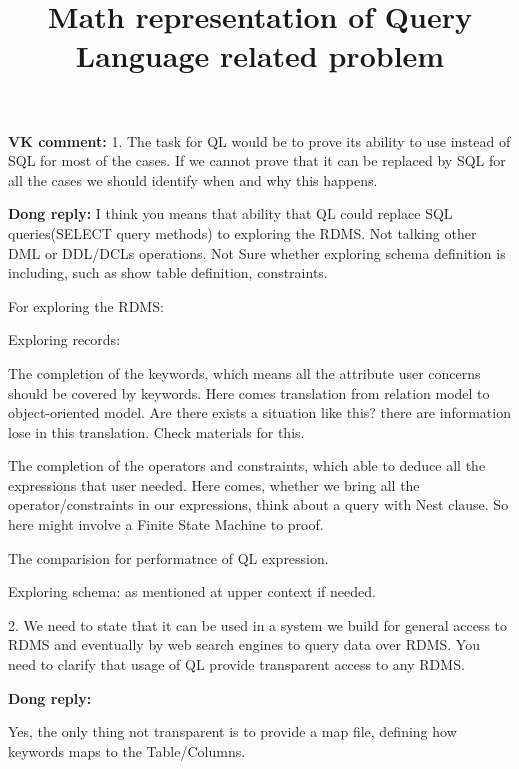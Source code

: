 \textheight 215mm
\textwidth 145mm

\oddsidemargin 0pt
\evensidemargin 0pt
\topmargin 0pt
\title{Math representation of Query Language related problem}
\maketitle
\vspace{0.5cm}

{\bf VK comment:} 
1. The task for QL would be to prove its ability to use
instead of SQL for most of the cases. If we cannot prove that it can be replaced by SQL for
all the cases we should identify when and why this happens.


\setlength{\parindent}{0.5in}
{\bf Dong reply:}
I think you means that ability that QL could replace SQL queries(SELECT query methods) to exploring the RDMS. Not talking other DML or DDL/DCLs operations. Not Sure whether exploring schema definition is including, such as show table definition, constraints.

For exploring the RDMS:

Exploring records:

The completion of the keywords, which means all the attribute user concerns should be covered by keywords. Here comes translation from relation model to object-oriented model. Are there exists a situation like this? there are information lose in this translation. Check materials for this. 

The completion of the operators and constraints, which able to deduce all the expressions that user needed. Here comes, whether we bring all the operator/constraints in our expressions, think about a query with Nest clause. So here might involve a Finite State Machine to proof.

The comparision for performatnce of QL expression.

Exploring schema: as mentioned at upper context if needed.

\setlength{\parindent}{0.25in}
2. We need to state that it can be used in a system we build for general
access to RDMS and eventually by web search engines to query data over RDMS.
You need to clarify that usage of QL provide transparent access to any RDMS.

\setlength{\parindent}{0.5in}
{\bf Dong reply:}

Yes, the only thing not transparent is to provide a map file, defining how keywords maps to the Table/Columns.
\setlength{\parindent}{0.25in}

